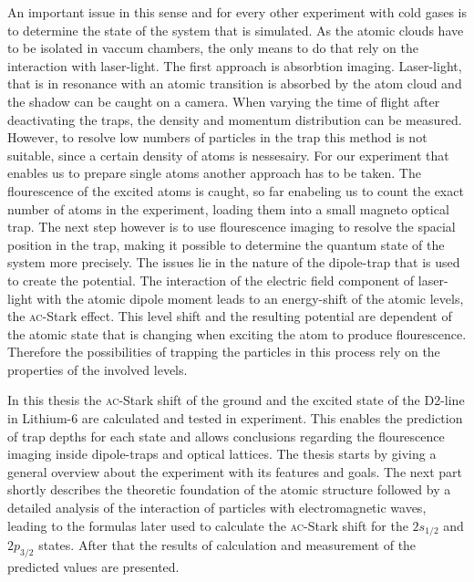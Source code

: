 An important issue in this sense and for every other experiment with cold gases is to determine the state of the system that is simulated. As the atomic clouds have to be isolated in vaccum chambers, the only means to do that rely on the interaction with laser-light. The first approach is absorbtion imaging. Laser-light, that is in resonance with an atomic transition is absorbed by the atom cloud and the shadow can be caught on a camera. When varying the time of flight after deactivating the traps, the density and momentum distribution can be measured. However, to resolve low numbers of particles in the trap this method is not suitable, since a certain density of atoms is nessesairy. For our experiment that enables us to prepare single atoms another approach has to be taken. The flourescence of the excited atoms is caught, so far enabeling us to count the exact number of atoms in the experiment, loading them into a small magneto optical trap. The next step however is to use flourescence imaging to resolve the spacial position in the trap, making it possible to determine the quantum state of the system more precisely. The issues lie in the nature of the dipole-trap that is used to create the potential. The interaction of the electric field component of laser-light with the atomic dipole moment leads to an energy-shift of the atomic levels, the \textsc{ac}-Stark effect. This level shift and the resulting potential are dependent of the atomic state that is changing when exciting the atom to produce flourescence. Therefore the possibilities of trapping the particles in this process rely on the properties of the involved levels. 

In this thesis the \textsc{ac}-Stark shift of the ground and the excited state of the D2-line in Lithium-6 are calculated and tested in experiment. This enables the prediction of trap depths for each state and allows conclusions regarding the flourescence imaging inside dipole-traps and optical lattices. The thesis starts by giving a general overview about the experiment with its features and goals. The next part shortly describes the theoretic foundation of the atomic structure followed by a detailed analysis of the interaction of particles with electromagnetic waves, leading to the formulas later used to calculate the \textsc{ac}-Stark shift for the $2s_{1/2}$ and $2p_{3/2}$ states. After that the results of calculation and measurement of the predicted values are presented.

